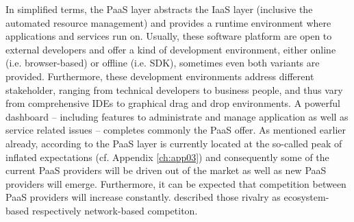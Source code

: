 In simplified terms, the \ac{PaaS} layer abstracts the \ac{IaaS} layer (inclusive the automated resource management) and provides a runtime environment where applications and services run on. Usually, these software platform are open to external developers and offer a kind of development environment, either online (i.e. browser-based) or offline (i.e. \ac{SDK}), sometimes even both variants are provided. Furthermore, these development environments address different stakeholder, ranging from technical developers to business people, and thus vary from comprehensive \acp{IDE} to graphical drag and drop environments. A powerful dashboard -- including features to administrate and manage application as well as service related issues -- completes commonly the \ac{PaaS} offer.
As mentioned earlier already, according to \citet[p. 5]{Smith2012} the \ac{PaaS} layer is currently located at the so-called peak of inflated expectations (cf. Appendix \ref{ch:app03}) and consequently some of the current \ac{PaaS} providers will be driven out of the market as well as new \ac{PaaS} providers will emerge. Furthermore, it can be expected that competition between \ac{PaaS} providers will increase constantly. \citet[pp. 117,128-129]{Iyer2010} described those rivalry as ecosystem-based respectively network-based competiton.







